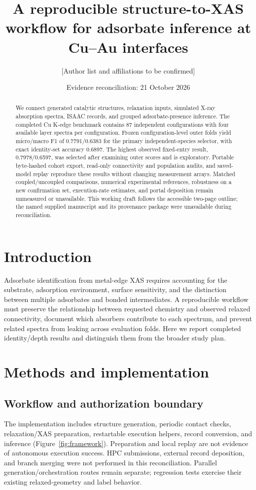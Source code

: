 \documentclass[11pt]{article}
\title{A reproducible structure-to-XAS workflow for adsorbate inference at Cu--Au interfaces}
\author{[Author list and affiliations to be confirmed]}
\date{Evidence reconciliation: 21 October 2026}
\begin{document}
\maketitle
\begin{abstract}
We connect generated catalytic structures, relaxation inputs, simulated X-ray absorption spectra, ISAAC records, and grouped adsorbate-presence inference. The completed Cu K-edge benchmark contains 87 independent configurations with four available layer spectra per configuration. Frozen configuration-level outer folds yield micro/macro F1 of 0.7791/0.6383 for the primary independent-species selector, with exact identity-set accuracy 0.6897. The highest observed fixed-entry result, 0.7978/0.6597, was selected after examining outer scores and is exploratory. Portable byte-hashed cohort export, read-only connectivity and population audits, and saved-model replay reproduce these results without changing measurement arrays. Matched coupled/uncoupled comparisons, numerical experimental references, robustness on a new confirmation set, execution-rate estimates, and portal deposition remain unmeasured or unavailable. This working draft follows the accessible two-page outline; the named supplied manuscript and its provenance package were unavailable during reconciliation.
\end{abstract}

\section{Introduction}
Adsorbate identification from metal-edge XAS requires accounting for the substrate, adsorption environment, surface sensitivity, and the distinction between multiple adsorbates and bonded intermediates. A reproducible workflow must preserve the relationship between requested chemistry and observed relaxed connectivity, document which absorbers contribute to each spectrum, and prevent related spectra from leaking across evaluation folds. Here we report completed identity/depth results and distinguish them from the broader study plan.

\section{Methods and implementation}
\subsection{Workflow and authorization boundary}
The implementation includes structure generation, periodic contact checks, relaxation/XAS preparation, restartable execution helpers, record conversion, and inference (Figure~\ref{fig:framework}). Preparation and local replay are not evidence of autonomous execution success. HPC submissions, external record deposition, and branch merging were not performed in this reconciliation. Parallel generation/orchestration routes remain separate; regression tests exercise their existing relaxed-geometry and label behavior.
\end{document}
